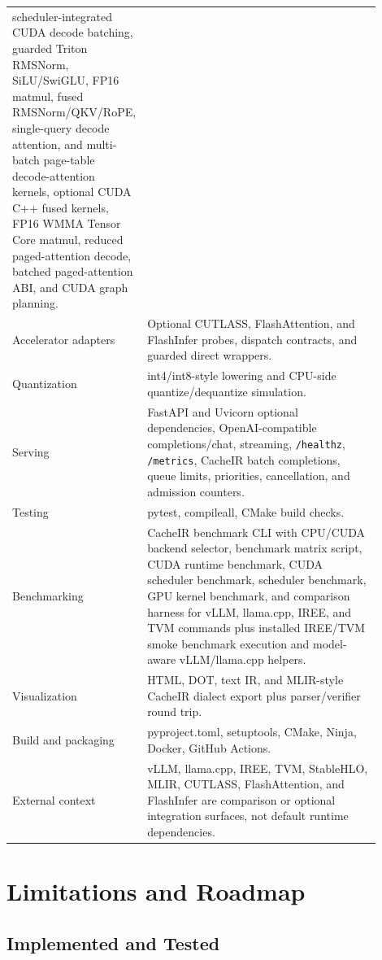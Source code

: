 \documentclass[11pt]{article}
\begin{document}
\begin{longtable}{p{0.26\linewidth}p{0.64\linewidth}}
scheduler-integrated CUDA decode batching, guarded Triton RMSNorm,
SiLU/SwiGLU, FP16 matmul, fused RMSNorm/QKV/RoPE, single-query decode attention,
and multi-batch page-table decode-attention kernels, optional CUDA C++ fused
kernels, FP16 WMMA Tensor Core matmul, reduced paged-attention decode, batched
paged-attention ABI, and CUDA graph planning. \\
Accelerator adapters & Optional CUTLASS, FlashAttention, and FlashInfer probes,
dispatch contracts, and guarded direct wrappers. \\
Quantization & int4/int8-style lowering and CPU-side quantize/dequantize
simulation. \\
Serving & FastAPI and Uvicorn optional dependencies, OpenAI-compatible
completions/chat, streaming, \texttt{/healthz}, \texttt{/metrics}, CacheIR batch
completions, queue limits, priorities, cancellation, and admission counters. \\
Testing & pytest, compileall, CMake build checks. \\
Benchmarking & CacheIR benchmark CLI with CPU/CUDA backend selector, benchmark
matrix script, CUDA runtime benchmark, CUDA scheduler benchmark, scheduler
benchmark, GPU kernel benchmark, and comparison harness for vLLM, llama.cpp,
IREE, and TVM commands plus installed IREE/TVM smoke benchmark execution and
model-aware vLLM/llama.cpp helpers. \\
Visualization & HTML, DOT, text IR, and MLIR-style CacheIR dialect export plus
parser/verifier round trip. \\
Build and packaging & pyproject.toml, setuptools, CMake, Ninja, Docker,
GitHub Actions. \\
External context & vLLM, llama.cpp, IREE, TVM, StableHLO, MLIR, CUTLASS,
FlashAttention, and FlashInfer are comparison or optional integration surfaces,
not default runtime dependencies. \\
\bottomrule
\end{longtable}

\section{Limitations and Roadmap}

\subsection{Implemented and Tested}
\end{document}
